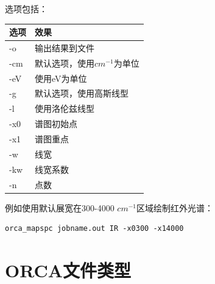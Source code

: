 \documentclass{ctexart}
\begin{document}
	选项包括：
	
	\begin{table}[H]
		\centering
		\begin{tabular}{ll}
			\toprule
			\textbf{选项}    & \textbf{效果}                  \\
			\midrule
			-o  & 输出结果到文件             \\
			-cm & 默认选项，使用$cm^{-1}$为单位 \\
			-eV & 使用eV为单位             \\
			-g  & 默认选项，使用高斯线型         \\
			-l  & 使用洛伦兹线型             \\
		-x0 & 谱图初始点               \\
			-x1 & 谱图重点                \\
		-w  & 线宽                  \\
			-kw & 线宽系数                \\
			-n  & 点数           \\
			\midrule      
		\end{tabular}
	\end{table}
	
	例如使用默认展宽在300-4000 $cm^{-1}$区域绘制红外光谱：
	
	\begin{lstlisting}
orca_mapspc jobname.out IR -x0300 -x14000
	\end{lstlisting}
	
	\section{ORCA文件类型}
	
\end{document}
